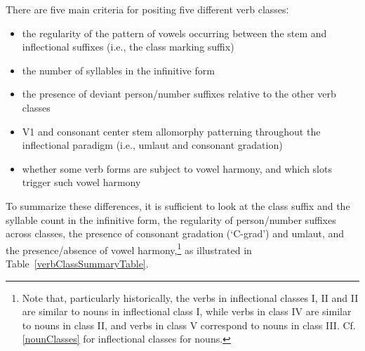 There are five main criteria for positing five different verb classesː
\begin{itemize}
\item{the regularity of the pattern of vowels occurring between the stem and inflectional suffixes (i.e., the class marking suffix)}
\item{the number of syllables in the infinitive form}
\item{the presence of deviant person/number suffixes relative to the other verb classes}
\item{V1 and consonant center stem allomorphy patterning throughout the inflectional paradigm (i.e., umlaut and consonant gradation)}
\item{whether some verb forms are subject to vowel harmony, and which slots trigger such vowel harmony}
\end{itemize} 
To summarize these differences, it is sufficient to look at the class suffix and the syllable count in the infinitive form, the regularity of person/number suffixes across classes, the presence of consonant gradation (‘C-grad’) and umlaut, and the presence/absence of vowel harmony,\footnote{Note that, particularly historically, the verbs in inflectional classes I, II and II are similar to nouns in inflectional class I, while verbs in class IV are similar to nouns in class II, and verbs in class V correspond to nouns in class III. Cf. \SEC\ref{nounClasses} for inflectional classes for nouns.} 
as illustrated in Table~\vref{verbClassSummaryTable}. %
